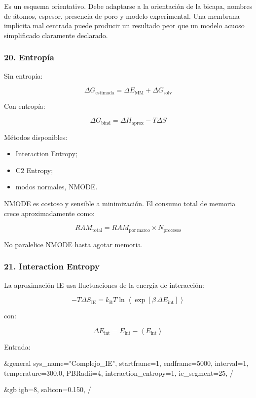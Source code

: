 \documentclass[
  spanish,
  11pt,
  a4paper]{article}
\newenvironment{Shaded}{\begin{snugshade}}{\end{snugshade}}
\newcommand{\NormalTok}[1]{#1}
\providecommand{\tightlist}{%
  \setlength{\itemsep}{0pt}\setlength{\parskip}{0pt}}
\begin{document}
Es un esquema orientativo. Debe adaptarse a la orientación de la bicapa,
nombres de átomos, espesor, presencia de poro y modelo experimental. Una
membrana implícita mal centrada puede producir un resultado peor que un
modelo acuoso simplificado claramente declarado.

\subsubsection{20. Entropía}\label{entropuxeda}

Sin entropía:

\[
\Delta G_{\mathrm{estimada}}
=
\Delta E_{\mathrm{MM}}
+
\Delta G_{\mathrm{solv}}
\]

Con entropía:

\[
\Delta G_{\mathrm{bind}}
=
\Delta H_{\mathrm{aprox}}
-
T\Delta S
\]

Métodos disponibles:

\begin{itemize}
\tightlist
\item
  Interaction Entropy;
\item
  C2 Entropy;
\item
  modos normales, NMODE.
\end{itemize}

NMODE es costoso y sensible a minimización. El consumo total de memoria
crece aproximadamente como:

\[
RAM_{\mathrm{total}}
=
RAM_{\mathrm{por\ marco}}
\times
N_{\mathrm{procesos}}
\]

No paralelice NMODE hasta agotar memoria.

\subsubsection{21. Interaction Entropy}\label{interaction-entropy}

La aproximación IE usa fluctuaciones de la energía de interacción:

\[
-T\Delta S_{\mathrm{IE}}
=
k_\mathrm{B}T
\ln
\left\langle
\exp
\left[
\beta\,
\Delta E_{\mathrm{int}}
\right]
\right\rangle
\]

con:

\[
\Delta E_{\mathrm{int}}
=
E_{\mathrm{int}}
-
\left\langle E_{\mathrm{int}}\right\rangle
\]

Entrada:

\begin{Shaded}
\begin{Highlighting}[]
\NormalTok{\&general}
\NormalTok{  sys\_name="Complejo\_IE",}
\NormalTok{  startframe=1,}
\NormalTok{  endframe=5000,}
\NormalTok{  interval=1,}
\NormalTok{  temperature=300.0,}
\NormalTok{  PBRadii=4,}
\NormalTok{  interaction\_entropy=1,}
\NormalTok{  ie\_segment=25,}
\NormalTok{/}

\NormalTok{\&gb}
\NormalTok{  igb=8,}
\NormalTok{  saltcon=0.150,}
\NormalTok{/}
\end{Highlighting}
\end{Shaded}
\end{document}
